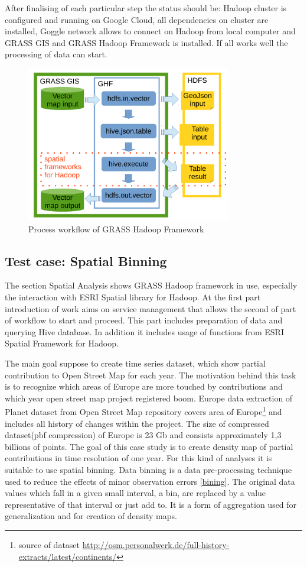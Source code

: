 \documentclass[a4paper,12pt,oneside]{report}
\begin{document}
	After finalising of each particular step the status should be: Hadoop cluster is configured and running on Google Cloud, all dependencies on cluster are installed, Goggle network allows to connect on Hadoop from local computer and GRASS GIS and GRASS Hadoop Framework is installed. If all works well the processing of data can start. 
		\begin{figure}[!htbp]
			\centering
			\includegraphics[width=0.8\textwidth]{./img/modules_schema.pdf}
			\caption[GHF workflow]{\centering Process workflow of GRASS Hadoop Framework 
			}
			\label{wokrflow}
		\end{figure} 
		
	
	\subsection{Test case: Spatial Binning}\label{spatial_anal_usage}
	The section Spatial Analysis shows GRASS Hadoop framework in use, especially 
	the interaction with ESRI Spatial library for Hadoop. 
	At the first part introduction of work aims on service management that allows 
	the second of part of workflow to start and proceed. This part includes preparation of data
	and querying Hive database. In addition it includes usage of functions from ESRI
	Spatial Framework for Hadoop.
	
	The main goal suppose to create time series dataset, which show partial contribution to Open
	Street Map for each year. The motivation behind this task is to recognize which areas of
	Europe are more touched by contributions and which year open street map
	project registered boom. Europe data extraction of Planet dataset from
	Open Street Map repository covers area of Europe\footnote{source of dataset
	\url{http://osm.personalwerk.de/full-history-extracts/latest/continents/}} 
	and includes all history of changes  within the project. The size of compressed
	dataset(pbf compression) of 
	Europe is 23 Gb and consists approximately 1,3 billions of points.
	The goal of this case study is to create density map of partial contributions in time
	resolution of one year. For this kind of analyses it is suitable to use spatial
	binning. Data binning is a data pre-processing technique used to reduce the
	effects of minor observation errors \ref{bining}. The original data values which
	fall in a given small interval, a bin, are replaced by a value representative of
	that interval or just add to. It is a form of aggregation used for
	generalization and for creation of density maps.
	
\end{document}
